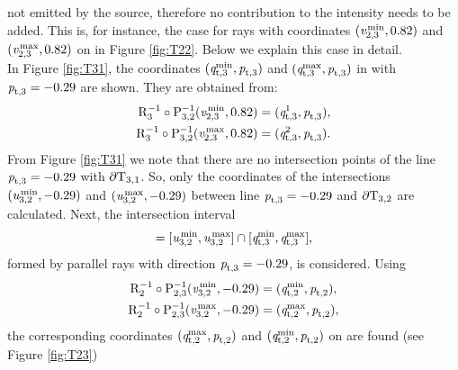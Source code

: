   not emitted by the source, therefore no contribution to the intensity needs to be added. This is, for instance, the case for rays with
  coordinates $(\textit{v}_{2, 3}^\textrm{\,min}, 0.82)$ and $(\textit{v}_{2, 3}^\textrm{\,max}, 0.82)$
  on  in Figure \ref{fig:T22}. Below we explain this case in detail. \\ \indent
  In Figure \ref{fig:T31}, the coordinates $(\textit{q}_{\textrm{t,} \textit{$3$}}^{\textrm{min}}, \textit{p}_{\textrm{t,} \textit{$3$}})$ and $(\textit{q}_{\textrm{t,} \textit{$3$}}^{\textrm{max}}, \textit{p}_{\textrm{t,} \textit{$3$}})$ in  with $\textit{p}_{\textrm{t,} \textit{$3$}}=-0.29$ are shown.
  They are obtained from:
\begin{equation}
\begin{split}
 \mathrm{R}_{{3}}^{-1}\circ\mathrm{P}_{{3,2}}^{-1}(\textit{v}_{2, 3}^\textrm{\,min}, 0.82)& = (\textit{q}_{\textrm{t,} \textit{$3$}}^{1}, \textit{p}_{\textrm{t,} \textit{$3$}}),\\
\mathrm{R}_{{3}}^{-1}\circ\mathrm{P}_{{3,2}}^{-1}(\textit{v}_{2, 3}^\textrm{\,max}, 0.82)& = (\textit{q}_{\textrm{t,} \textit{$3$}}^{2}, \textit{p}_{\textrm{t,} \textit{$3$}}).
\end{split}
\end{equation}
 From Figure \ref{fig:T31} we note that there are no intersection points of the line $\textit{p}_{\textrm{t,} \textit{$3$}}=-0.29$ with $\partial\mbox{$\textup{T}_{\textit{$3$,$1$}}$}$.
  So, only the coordinates of the intersections $(\textit{u}_{3, 2}^\textrm{\,min}, -0.29)$ and $(\textit{u}_{3, 2}^\textrm{\,max}, -0.29)$ between line $\textit{p}_{\textrm{t,} \textit{$3$}}=-0.29$ and  $\partial\mbox{$\textup{T}_{\textit{$3$,$2$}}$}$ are calculated.
  Next, the intersection interval 
\begin{equation}
[\variabile{v}_{3, 2}^\textrm{\,min},\variabile{v}_{3, 2}^\textrm{\,max}] = [\variabile{u}_{3, 2}^\textrm{\,min}, \variabile{u}_{3, 2}^\textrm{\,max}] \cap [\pos{t,}{$3$}^{\textrm{min}}, \pos{t,}{$3$}^{\textrm{max}}],
\end{equation} formed by parallel rays with direction $\textit{p}_{\textrm{t,} \textit{$3$}} = -0.29$, is considered.
  Using
\begin{equation}
\begin{split}
 \mathrm{R}_{{2}}^{-1}\circ\mathrm{P}_{{2,3}}^{-1}(\textit{v}_{3, 2}^\textrm{\,min},-0.29) & = (\textit{q}_{\textrm{t,} \textit{$2$}}^{\textrm{min}}, \textit{p}_{\textrm{t,} \textit{$2$}}),\\
 \mathrm{R}_{{2}}^{-1}\circ\mathrm{P}_{{2,3}}^{-1}(\textit{v}_{3, 2}^\textrm{\,max},-0.29) & = (\textit{q}_{\textrm{t,} \textit{$2$}}^{\textrm{max}}, \textit{p}_{\textrm{t,} \textit{$2$}}),\\
\end{split}
\end{equation}
  the corresponding coordinates $(\textit{q}_{\textrm{t,} \textit{$2$}}^{\textrm{max}}, \textit{p}_{\textrm{t,} \textit{$2$}})$ and $(\textit{q}_{\textrm{t,} \textit{$2$}}^{\textrm{min}}, \textit{p}_{\textrm{t,} \textit{$2$}})$ on  are found (see Figure \ref{fig:T23})
